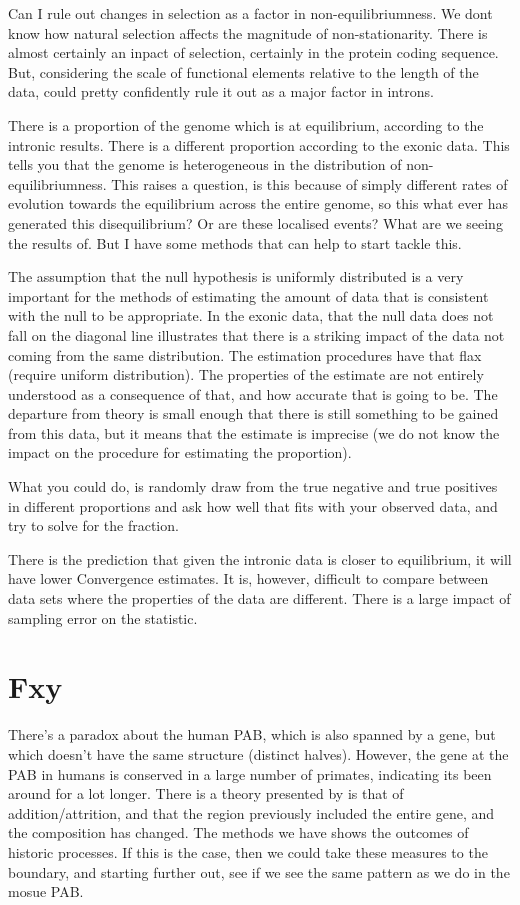 Can I rule out changes in selection as a factor in non-equilibriumness. We dont know how natural selection affects the magnitude of non-stationarity. There is almost certainly an inpact of selection, certainly in the protein coding sequence. But, considering the scale of functional elements relative to the length of the data, could pretty confidently rule it out as a major factor in introns. 


There is a proportion of the genome which is at equilibrium, according to the intronic results. There is a different proportion according to the exonic data. This tells you that the genome is heterogeneous in the distribution of non-equilibriumness. This raises a question, is this because of simply different rates of evolution towards the equilibrium across the entire genome, so this what ever has generated this disequilibrium? Or are these localised events? What are we seeing the results of. But I have some methods that can help to start tackle this. 


The assumption that the null hypothesis is uniformly distributed is a very important for the methods of estimating the amount of data that is consistent with the null to be appropriate. In the exonic data, that the null data does not fall on the diagonal line illustrates that there is a striking impact of the data not coming from the same distribution. The estimation procedures have that flax (require uniform distribution). The properties of the estimate are not entirely understood as a consequence of that, and how accurate that is going to be. The departure from theory is small enough that there is still something to be gained from this data, but it means that the estimate is imprecise (we do not know the impact on the procedure for estimating the proportion). 

What you could do, is randomly draw from the true negative and true positives in different proportions and ask how well that fits with your observed data, and try to solve for the fraction. 

There is the prediction that given the intronic data is closer to equilibrium, it will have  lower Convergence estimates. It is, however, difficult to compare between data sets where the properties of the data are different. There is a large impact of sampling error on the statistic. 



\section{Fxy}
There's a paradox about the human PAB, which is also spanned by a gene, but which doesn't have the same structure (distinct halves). However, the gene at the PAB in humans is conserved in a large number of primates, indicating its been around for a lot longer. There is a theory presented by \cite{Galtier2004RecombinationParadox} is that of addition/attrition, and that the region previously included the entire gene, and the composition has changed. The methods we have shows the outcomes of historic processes. If this is the case, then we could take these measures to the boundary, and starting further out, see if we see the same pattern as we do in the mosue PAB. 



